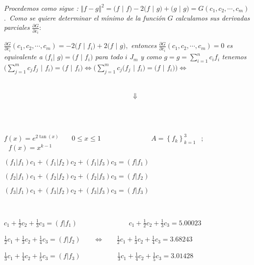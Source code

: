 \documentclass{article}
\begin{document}
\textit{Procedemos como sigue : }$\left\Vert f-g\right\Vert ^{2}=(f$ $|$ $%
f)-2(f$ $|$ $g)+(g$ $|$ $g)=G(c_{1},c_{2},\cdots ,c_{m})$.\textit{\ Como se
quiere determinar el m\'{\i}nimo de la funci\'{o}n }$G$ \textit{calculamos
sus derivadas parciales }$\frac{\partial G}{\partial c_{i}}:$

$\frac{\partial G}{\partial c_{i}}(c_{1},c_{2},\cdots ,c_{m})=-2(f$ $|$ $%
f_{i})+2(f$ $|$ $g),$ \textit{entonces }$\frac{\partial G}{\partial c_{i}}%
(c_{1},c_{2},\cdots ,c_{m})=0$ \textit{es equivalente a }$(f_{i}|$ $g)=(f$ $%
| $ $f_{i})$ \textit{para todo }$i$ $J_{m}$ \textit{y como }$%
g=g=\sum\limits_{i=1}^{n}c_{i}f_{i}$ \textit{tenemos }$(\sum%
\limits_{j=1}^{m}c_{j}f_{j}$ $|$ $f_{i})=(f$ $|$ $f_{i})\Leftrightarrow
(\sum\limits_{j=1}^{m}c_{j}(f_{j}$ $|$ $f_{i})=(f$ $|$ $f_{i}))%
\Leftrightarrow $

\ \ \ \ \ \ \ \ \ \ \ \ \ \ \ \ \ \ \ \ \ \ \ \ \ \ \ \ \ \ \ \ \ \ \ \ \ \
\ \ \ \ \ \ \ \ \ \ \ \ \ \ \ \ \ \ \ \ \ \ \ \ \ \ \ \ \ \ \ \ \ \ \ \ \ \
\ \ \ \ \ \ \ \ \ \ \ \ \ \ \ \ \ \ \ \ \ \ \ \ \ \ \ \ \ \ \ \ \ $%
\Downarrow $

\ \ \ \ \ \ \ \ \ \ \ \ \ \ \ \ \ \ \ \ \ \ \ \ \ \ \ \ \ \ \ \ \ \ \ \ \ \
\ \ \ \ \ \ \ \ \ \ \ \ \ \ \ \ \ \ \ \ \ \ \ \ \ \ \ \ \ \ \ \ \ \ \ \ \ \
\ \ \ \ \ \ \ 

\fbox{\emph{Ejemplo:}}

$f(x)=e^{2\tan (x)}$ \ \ \ $0\leq x\leq 1$ \ \ \ \ \ \ \ \ \ \ \ \ \ \ $%
A=\left\{ f_{k}\right\} _{k=1}^{3}$ $\ \ ;$ $\ \ \ f(x)=x^{k-1}$

$(f_{1}|f_{1})c_{1}+(f_{1}|f_{2})c_{2}+(f_{1}|f_{3})c_{3}=(f|f_{1})$

$(f_{2}|f_{1})c_{1}+(f_{2}|f_{2})c_{2}+(f_{2}|f_{3})c_{3}=(f|f_{2})$

$(f_{3}|f_{1})c_{1}+(f_{3}|f_{2})c_{2}+(f_{3}|f_{3})c_{3}=(f|f_{3})$

\ \ \ 

$c_{1}+\frac{1}{2}c_{2}+\frac{1}{3}c_{3}=(f|f_{1})$ \ \ \ \ \ \ \ \ \ \ \ \
\ $\ \ \ c_{1}+\frac{1}{2}c_{2}+\frac{1}{3}c_{3}=5.00023$

$\frac{1}{2}c_{1}+\frac{1}{3}c_{2}+\frac{1}{4}c_{3}=(f|f_{2})$ \ \ \ $%
\Leftrightarrow $ \ \ \ $\frac{1}{2}c_{1}+\frac{1}{3}c_{2}+\frac{1}{4}%
c_{3}=3.68243$

$\frac{1}{3}c_{1}+\frac{1}{4}c_{2}+\frac{1}{5}c_{3}=(f|f_{3})$ \ \ \ \ \ \ \
\ \ \ $\frac{1}{3}c_{1}+\frac{1}{4}c_{2}+\frac{1}{5}c_{3}=3.01428$
\end{document}
